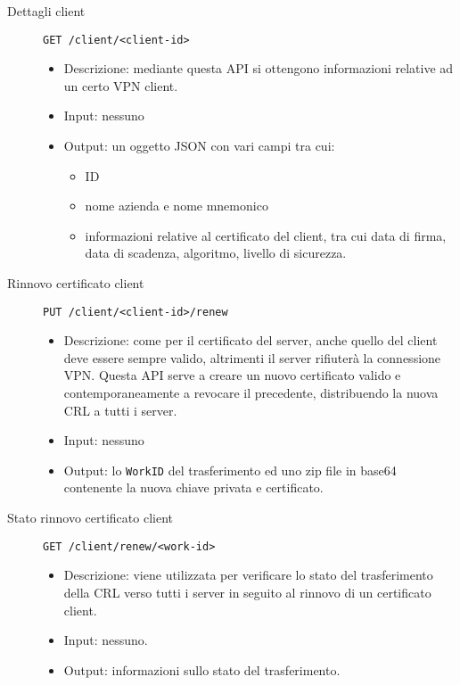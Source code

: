 \begin{description}
    \item[Dettagli client]\texttt{GET /client/<client-id>}
    \begin{itemize}
        \item Descrizione: mediante questa API si ottengono informazioni relative ad
        un certo VPN client.
        \item Input: nessuno
        \item Output: un oggetto JSON con vari campi tra cui:
        \begin{itemize}
            \item ID
            \item nome azienda e nome mnemonico
            \item informazioni relative al certificato del client, tra cui data di firma,
            data di scadenza, algoritmo, livello di sicurezza.
        \end{itemize}
    \end{itemize}

    \item[Rinnovo certificato client]\texttt{PUT /client/<client-id>/renew}
    \begin{itemize}
        \item Descrizione: come per il certificato del server, anche quello
        del client deve essere sempre valido, altrimenti il server rifiuterà
        la connessione VPN. Questa API serve a creare un nuovo certificato valido
        e contemporaneamente a revocare il precedente, distribuendo la nuova CRL
        a tutti i server.
        \item Input: nessuno
        \item Output: lo \texttt{WorkID} del trasferimento ed uno zip file
        in base64 contenente la nuova chiave privata e certificato.
    \end{itemize}

    \item[Stato rinnovo certificato client]\texttt{GET /client/renew/<work-id>}
    \begin{itemize}
        \item Descrizione: viene utilizzata per verificare lo stato del
        trasferimento della CRL verso tutti i server in seguito al rinnovo
        di un certificato client.
        \item Input: nessuno.
        \item Output: informazioni sullo stato del trasferimento.
    \end{itemize}


\end{description}
